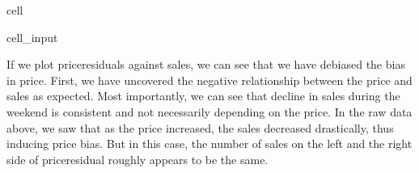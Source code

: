 \documentclass[letterpaper,10pt,english]{jupyterBook}
\begin{document}
\begin{sphinxuseclass}{cell}\begin{sphinxVerbatimInput}

\begin{sphinxuseclass}{cell_input}
\begin{sphinxVerbatim}[commandchars=\\\{\}]
   
   

  
\end{sphinxVerbatim}

\end{sphinxuseclass}\end{sphinxVerbatimInput}

\end{sphinxuseclass}
\sphinxAtStartPar
If we plot price\sphinxhyphen{}residuals against sales, we can see that we have debiased the bias in price. First, we have uncovered the negative relationship between the price and sales as expected. Most importantly, we can see that decline in sales during the weekend is consistent and not necessarily depending on the price. In the raw data above, we saw that as the price increased, the sales decreased drastically, thus inducing price bias. But in this case, the number of sales on the left and the right side of price\sphinxhyphen{}residual roughly appears to be the same.
\end{document}
